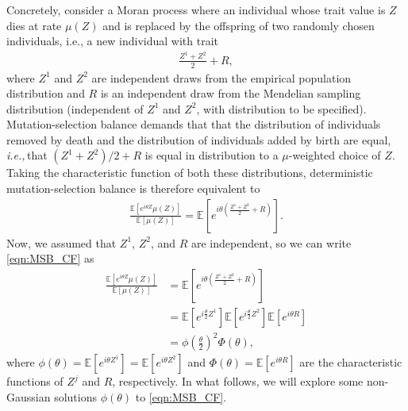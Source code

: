 \documentclass{article}
\newcommand{\E}{\mathbb{E}}
\newcommand{\R}{\mathbb{R}}
\newcommand{\ie}{\textit{i.e.,}\,}
\newcommand{\eg}{\textit{e.g.,}\,}
\newcommand{\1}{\mathbbm{1}}
\theoremstyle{remark}
\theoremstyle{definition}
\begin{document}
Concretely, consider a  Moran process where an individual whose trait value is $Z$ dies at rate $\mu(Z)$
and is replaced by the offspring of two randomly chosen individuals,
i.e., a new individual with trait
\begin{align*}
  \frac{Z^{1} +Z^{2}}{2} + R ,
\end{align*}
where $Z^{1}$ and $Z^{2}$ are independent draws from the empirical population distribution
and $R$ is an independent draw from the Mendelian sampling distribution
(independent of $Z^{1}$ and $Z^{2}$, with distribution to be specified). 
Mutation-selection balance demands that that
the distribution of individuals removed by death
and the distribution of individuals added by birth are equal,
\ie that $(Z^{1} +Z^{2})/2 + R$ is equal in distribution
to a $\mu$-weighted choice of $Z$.
% 
Taking the characteristic function of both these distributions,
deterministic mutation-selection balance is therefore equivalent to
\begin{align} \label{eqn:MSB_CF}
    \frac{\E\left[ e^{i \theta Z}\mu(Z) \right]}{\E[\mu(Z)]}
    =
    \E\left[ e^{i\theta\left(\frac{Z^{1} +Z^{2}}{2} + R \right)}\right] .
\end{align}
Now, we assumed that $Z^{1}$, $Z^{2}$, and $R$ are independent, so we can write \eqref{eqn:MSB_CF} as 
\begin{align*}
    \frac{\E\left[ e^{i\theta Z} \mu(Z) \right]}{\E[\mu(Z)]} &= \E\left[ e^{i\theta\left(\frac{Z^{1} +Z^{2}}{2} + R \right)}\right]\\
	&= \E\left[e^{i\frac{\theta}{2} Z^{1}}\right]\E\left[e^{i\frac{\theta}{2} Z^{2}}\right]\E\left[e^{i\theta R}\right]\\
	&= \phi\left(\frac{\theta}{2}\right)^{2} \Phi(\theta),
\end{align*}
where
$ \phi(\theta) = \mathbb{E}\left[e^{i\theta Z^{1}}\right] = \mathbb{E}\left[e^{i\theta Z^{2}}\right] $
and
$ \Phi(\theta) = \mathbb{E}\left[e^{i\theta R}\right] $
are the characteristic functions of $Z^{j}$ and $R$, respectively.  In what follows, we will explore some non-Gaussian solutions $\phi(\theta)$ to \eqref{eqn:MSB_CF}.
\end{document}

